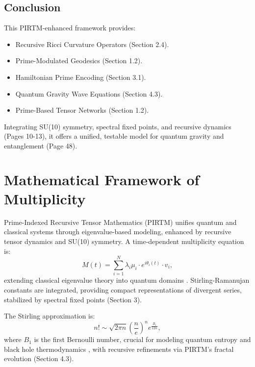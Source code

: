 \documentclass{article}
\theoremstyle{plain}
\begin{document}
\subsection{Conclusion}
This PIRTM-enhanced framework provides:
\begin{itemize}
    \item Recursive Ricci Curvature Operators (Section 2.4).
    \item Prime-Modulated Geodesics (Section 1.2).
    \item Hamiltonian Prime Encoding (Section 3.1).
    \item Quantum Gravity Wave Equations (Section 4.3).
    \item Prime-Based Tensor Networks (Section 1.2).
\end{itemize}
Integrating SU(10) symmetry, spectral fixed points, and recursive dynamics (Pages 10-13), it offers a unified, testable model for quantum gravity and entanglement (Page 48).

\section{Mathematical Framework of Multiplicity}

Prime-Indexed Recursive Tensor Mathematics (PIRTM) unifies quantum and classical systems through eigenvalue-based modeling, enhanced by recursive tensor dynamics and SU(10) symmetry. A time-dependent multiplicity equation is:
\begin{equation}
M(t) = \sum_{i=1}^N \lambda_i \mu_i \cdot e^{i \theta_i(t)} \cdot v_i,
\end{equation}
extending classical eigenvalue theory into quantum domains \cite{Schrodinger1926, Maldacena1999}. Stirling-Ramanujan constants are integrated, providing compact representations of divergent series, stabilized by spectral fixed points (Section 3).

The Stirling approximation is:
\begin{equation}
n! \sim \sqrt{2 \pi n} \left( \frac{n}{e} \right)^n e^{\frac{B_1}{12n}},
\end{equation}
where \( B_1 \) is the first Bernoulli number, crucial for modeling quantum entropy and black hole thermodynamics \cite{Bekenstein1973, Hawking1975}, with recursive refinements via PIRTM’s fractal evolution (Section 4.3).
\end{document}
